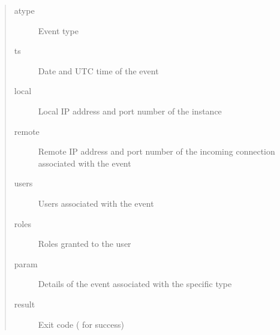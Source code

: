 \documentclass[letterpaper,10pt,english]{sphinxmanual}
\begin{document}
\begin{sphinxVerbatim}[commandchars=\\\{\}]
   
       
        
        
    \PYG{p}{[}        \PYG{p}{]}
   \PYG{p}{[}        \PYG{p}{]}
   
   
\end{sphinxVerbatim}
\begin{quote}\begin{description}
\item[{atype}] \leavevmode
\sphinxAtStartPar
Event type

\item[{ts}] \leavevmode
\sphinxAtStartPar
Date and UTC time of the event

\item[{local}] \leavevmode
\sphinxAtStartPar
Local IP address and port number of the instance

\item[{remote}] \leavevmode
\sphinxAtStartPar
Remote IP address and port number
of the incoming connection associated with the event

\item[{users}] \leavevmode
\sphinxAtStartPar
Users associated with the event

\item[{roles}] \leavevmode
\sphinxAtStartPar
Roles granted to the user

\item[{param}] \leavevmode
\sphinxAtStartPar
Details of the event associated with the specific type

\item[{result}] \leavevmode
\sphinxAtStartPar
Exit code ( for success)

\end{description}\end{quote}
\end{document}
